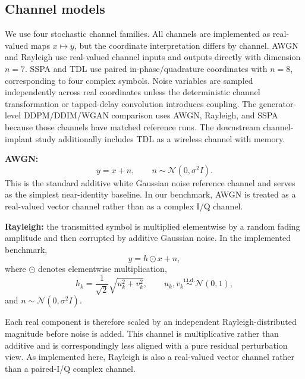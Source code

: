 \subsection{Channel models}
We use four stochastic channel families.
All channels are implemented as real-valued maps \(x\mapsto y\), but the coordinate interpretation differs by channel.
AWGN and Rayleigh use real-valued channel inputs and outputs directly with dimension \(n=7\).
SSPA and TDL use paired in-phase/quadrature coordinates with \(n=8\), corresponding to four complex symbols.
Noise variables are sampled independently across real coordinates unless the deterministic channel transformation or tapped-delay convolution introduces coupling.
The generator-level DDPM/DDIM/WGAN comparison uses AWGN, Rayleigh, and SSPA because those channels have matched reference runs.
The downstream channel-implant study additionally includes TDL as a wireless channel with memory.

\textbf{AWGN:}
\begin{equation}
y = x + n,
\qquad
n \sim \mathcal{N}(0,\sigma^2 I).
\end{equation}
This is the standard additive white Gaussian noise reference channel and serves as the simplest near-identity baseline.
In our benchmark, AWGN is treated as a real-valued vector channel rather than as a complex I/Q channel.

\textbf{Rayleigh:}
the transmitted symbol is multiplied elementwise by a random fading amplitude and then corrupted by additive Gaussian noise.
In the implemented benchmark,
\begin{equation}
y = h \odot x + n,
\end{equation}
where \(\odot\) denotes elementwise multiplication,
\begin{equation}
h_k = \frac{1}{\sqrt{2}}\sqrt{u_k^2 + v_k^2},
\qquad
u_k,v_k \overset{\text{i.i.d.}}{\sim} \mathcal{N}(0,1),
\end{equation}
and $n \sim \mathcal{N}(0,\sigma^2 I).$

Each real component is therefore scaled by an independent Rayleigh-distributed magnitude before noise is added.
This channel is multiplicative rather than additive and is correspondingly less aligned with a pure residual perturbation view.
As implemented here, Rayleigh is also a real-valued vector channel rather than a paired-I/Q complex channel.

